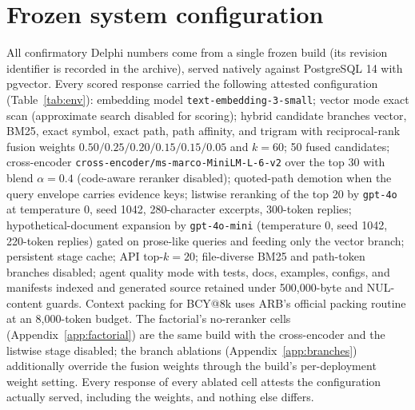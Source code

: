 \documentclass{article}
\newcommand{\system}{Delphi}
\begin{document}
\section{Frozen system configuration}
\label{app:system}

All confirmatory \system{} numbers come from a single frozen build (its
revision identifier is recorded in the archive), served natively against
PostgreSQL 14 with pgvector. Every scored response carried the following
attested configuration (Table~\ref{tab:env}): embedding model
\texttt{text-embedding-3-small}; vector mode exact scan (approximate search
disabled for scoring); hybrid candidate branches vector, BM25, exact symbol,
exact path, path affinity, and trigram with reciprocal-rank fusion weights
$0.50/0.25/0.20/0.15/0.15/0.05$ and $k{=}60$; 50 fused candidates;
cross-encoder \texttt{cross-encoder/ms-marco-MiniLM-L-6-v2} over the top 30
with blend $\alpha{=}0.4$ (code-aware reranker disabled); quoted-path demotion
when the query envelope carries evidence keys; listwise reranking of the top 20
by \texttt{gpt-4o} at temperature 0, seed 1042, 280-character excerpts,
300-token replies; hypothetical-document expansion by \texttt{gpt-4o-mini}
(temperature 0, seed 1042, 220-token replies) gated on prose-like queries and
feeding only the vector branch; persistent stage cache; API
$\text{top-}k{=}20$; file-diverse BM25 and path-token branches disabled; agent
quality mode with tests, docs, examples, configs, and manifests indexed and
generated source retained under 500{,}000-byte and NUL-content guards. Context
packing for BCY@8k uses ARB's official packing routine at an 8{,}000-token
budget. The factorial's no-reranker cells (Appendix~\ref{app:factorial}) are
the same build with the cross-encoder and the listwise stage disabled; the
branch ablations (Appendix~\ref{app:branches}) additionally override the fusion
weights through the build's per-deployment weight setting. Every response of
every ablated cell attests the configuration actually served, including the
weights, and nothing else differs.
\end{document}
